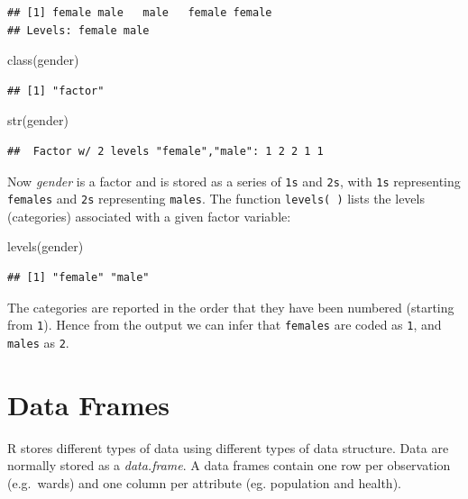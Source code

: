 \documentclass[
]{book}
\newenvironment{Shaded}{\begin{snugshade}}{\end{snugshade}}
\newcommand{\FunctionTok}[1]{\textcolor[rgb]{0.00,0.00,0.00}{#1}}
\newcommand{\NormalTok}[1]{#1}
\begin{document}
\begin{verbatim}
## [1] female male   male   female female
## Levels: female male
\end{verbatim}

\begin{Shaded}
\begin{Highlighting}[]
\FunctionTok{class}\NormalTok{(gender)}
\end{Highlighting}
\end{Shaded}

\begin{verbatim}
## [1] "factor"
\end{verbatim}

\begin{Shaded}
\begin{Highlighting}[]
\FunctionTok{str}\NormalTok{(gender)}
\end{Highlighting}
\end{Shaded}

\begin{verbatim}
##  Factor w/ 2 levels "female","male": 1 2 2 1 1
\end{verbatim}

Now \emph{gender} is a factor and is stored as a series of \texttt{1s} and \texttt{2s}, with \texttt{1s} representing \texttt{females} and \texttt{2s} representing \texttt{males}. The function \texttt{levels(\ )} lists the levels (categories) associated with a given factor variable:

\begin{Shaded}
\begin{Highlighting}[]
\FunctionTok{levels}\NormalTok{(gender)}
\end{Highlighting}
\end{Shaded}

\begin{verbatim}
## [1] "female" "male"
\end{verbatim}

The categories are reported in the order that they have been numbered (starting from \texttt{1}). Hence from the output we can infer that \texttt{females} are coded as \texttt{1}, and \texttt{males} as \texttt{2}.

\hypertarget{data-frames}{%
\section{Data Frames}\label{data-frames}}

R stores different types of data using different types of data structure. Data are normally stored as a \emph{data.frame}. A data frames contain one row per observation (e.g.~wards) and one column per attribute (eg. population and health).
\end{document}
